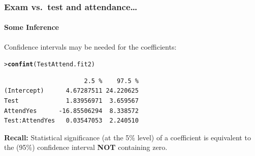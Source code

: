 \documentclass{beamer}\usepackage[]{graphicx}\usepackage[]{xcolor}
\makeatletter
\newcommand{\hlstd}[1]{\textcolor[rgb]{0.345,0.345,0.345}{#1}}%
\newcommand{\hlkwd}[1]{\textcolor[rgb]{0.737,0.353,0.396}{\textbf{#1}}}%
\newenvironment{kframe}{%
 \def\at@end@of@kframe{}%
 \ifinner\ifhmode%
  \def\at@end@of@kframe{\end{minipage}}%
  \begin{minipage}{\columnwidth}%
 \fi\fi%
 \def\FrameCommand##1{\hskip\@totalleftmargin \hskip-\fboxsep
 \colorbox{shadecolor}{##1}\hskip-\fboxsep
     \hskip-\linewidth \hskip-\@totalleftmargin \hskip\columnwidth}%
 \MakeFramed {\advance\hsize-\width
   \@totalleftmargin\z@ \linewidth\hsize
   \@setminipage}}%
 {\par\unskip\endMakeFramed%
 \at@end@of@kframe}
\newenvironment{knitrout}{}{} %
\makeatother
\begin{document}
\begin{frame}[fragile]
\frametitle{Exam vs.\ test \textbf{and} attendance\ldots}
\framesubtitle{Some Inference}

Confidence intervals may be needed for the coefficients:\\
\bigskip
\begin{knitrout}\scriptsize
{}\color{fgcolor}\begin{kframe}
\begin{alltt}
\hlstd{> }\hlkwd{confint}\hlstd{(TestAttend.fit2)}
\end{alltt}
\begin{verbatim}
                      2.5 %    97.5 %
(Intercept)      4.67287511 24.220625
Test             1.83956971  3.659567
AttendYes      -16.85506294  8.338572
Test:AttendYes   0.03547053  2.240510
\end{verbatim}
\end{kframe}
\end{knitrout}
\bigskip \bigskip

\textbf{Recall:} Statistical significance (at the 5\% level) of a coefficient is equivalent to the (95\%) confidence interval \textbf{NOT} containing zero. 
\end{frame}
\end{document}
